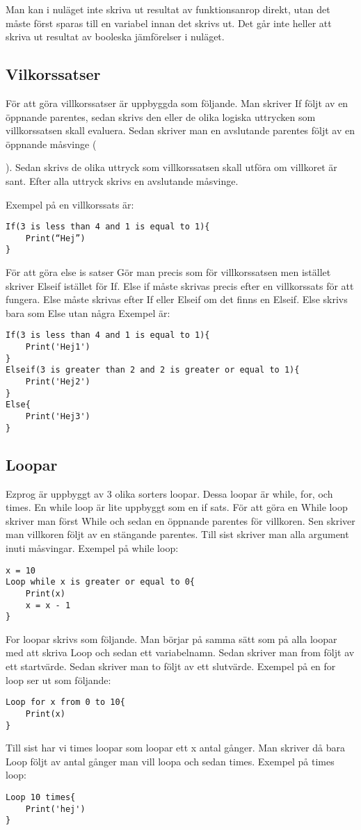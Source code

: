 \documentclass{TDP003mall}
\begin{document}
Man kan i nuläget inte skriva ut resultat av funktionsanrop direkt, utan det måste först sparas till en variabel innan det skrivs ut. Det går inte heller att skriva ut resultat av booleska jämförelser i nuläget.

\subsection{Vilkorssatser}
För att göra villkorssatser är uppbyggda som följande. Man skriver If följt av en öppnande parentes, sedan skrivs den eller de olika logiska uttrycken som villkorssatsen skall evaluera. Sedan skriver man en avslutande parentes följt av en öppnande måsvinge ({). Sedan skrivs de olika uttryck som villkorssatsen skall utföra om villkoret är sant. Efter alla uttryck skrivs en avslutande måsvinge.


Exempel på en villkorssats är:
\begin{lstlisting}
If(3 is less than 4 and 1 is equal to 1){
    Print(“Hej”)
}
\end{lstlisting}
För att göra else is satser Gör man precis som för villkorssatsen men istället skriver Elseif istället för If. Else if måste skrivas precis efter en villkorssats för att fungera. Else måste skrivas efter If eller Elseif om det finns en Elseif. Else skrivs bara som Else utan några Exempel är:
\begin{lstlisting}
If(3 is less than 4 and 1 is equal to 1){
    Print('Hej1')
}
Elseif(3 is greater than 2 and 2 is greater or equal to 1){
    Print('Hej2')
}
Else{
    Print('Hej3')
}
\end{lstlisting}
\clearpage
\subsection{Loopar}
Ezprog är uppbyggt av 3 olika sorters loopar. Dessa loopar är while, for,  och times. En while loop är lite uppbyggt som en if sats. För att göra en While loop skriver man först While och sedan en öppnande parentes för villkoren. Sen skriver man villkoren följt av en stängande parentes. Till sist skriver man alla argument inuti måsvingar. Exempel på while loop:
\begin{lstlisting}
x = 10
Loop while x is greater or equal to 0{
    Print(x)
    x = x - 1    
}
\end{lstlisting}
For loopar skrivs som följande. Man börjar på samma sätt som på alla loopar med att skriva Loop och sedan ett variabelnamn. Sedan skriver man from följt av ett startvärde. Sedan skriver man to följt av ett slutvärde. Exempel på en for loop ser ut som följande:
\begin{lstlisting}
Loop for x from 0 to 10{
    Print(x)
}
\end{lstlisting}
Till sist har vi times loopar som loopar ett x antal gånger. Man skriver då bara Loop följt av antal gånger man vill loopa och sedan times. Exempel på times loop:
\begin{lstlisting}
Loop 10 times{
    Print('hej')
}
\end{lstlisting}
\clearpage
}
\end{document}
